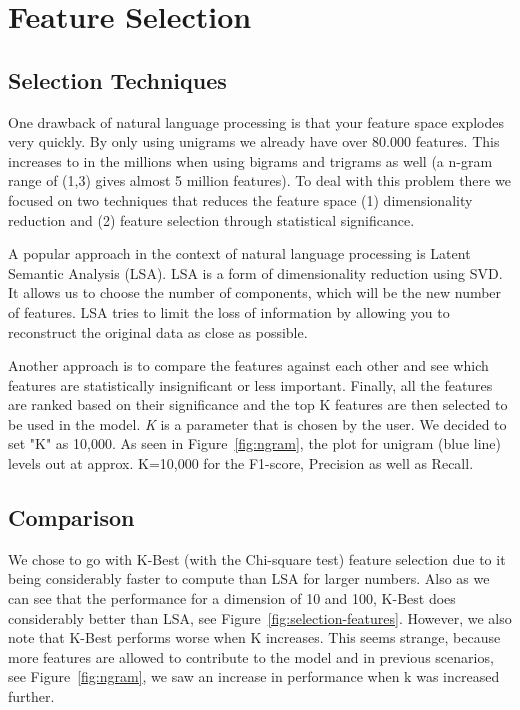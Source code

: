 \section{Feature Selection}

\subsection{Selection Techniques}
One drawback of natural language processing is that your feature space explodes very quickly.
By only using unigrams we already have over 80.000 features.
This increases to in the millions when using bigrams and trigrams as well (\eg a n-gram range of (1,3) gives almost 5 million features).
To deal with this problem there we focused on two techniques that reduces the feature space (1) dimensionality reduction and (2) feature selection through statistical significance.

A popular approach in the context of natural language processing is Latent Semantic Analysis (LSA). LSA is a form of dimensionality reduction using SVD. It allows us to choose the number of components, which will be the new number of features. LSA tries to limit the loss of information by allowing you to reconstruct the original data as close as possible.


Another approach is to compare the features against each other and see which features are statistically insignificant or less important. Finally, all the features are ranked based on their significance and the top K features are then selected to be used in the model. \textit{K} is a parameter that is chosen by the user. We decided to set "K" as 10,000. As seen in Figure~\ref{fig:ngram}, the plot for unigram (blue line) levels out at approx. K=10,000 for the F1-score, Precision as well as Recall.

\subsection{Comparison}
We chose to go with K-Best (with the Chi-square test) feature selection due to it being considerably faster to compute than LSA for larger numbers. Also as we can see that the performance for a dimension of 10 and 100, K-Best does considerably better than LSA, see Figure~\ref{fig:selection-features}. However, we also note that K-Best performs worse when K increases. This seems strange, because more features are allowed to contribute to the model and in previous scenarios, see Figure~\ref{fig:ngram}, we saw an increase in performance when k was increased further. 


